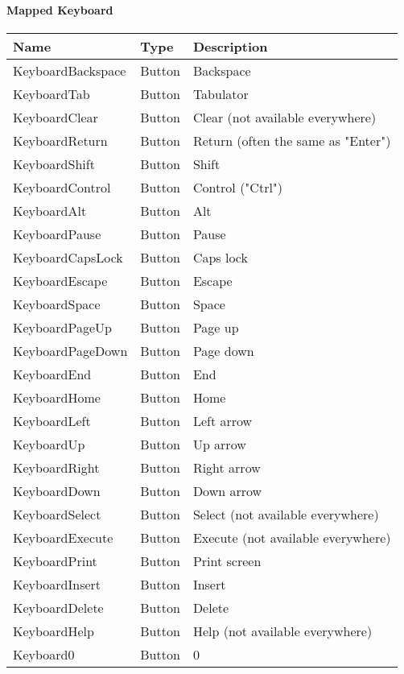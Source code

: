 \paragraph{Mapped Keyboard}
\begin{center}
	\centering
	\begin{longtable}{ | l | l | p{9cm} |}
	\hline
	Name						&	Type	&	Description \\ \hline
	KeyboardBackspace			&	Button	&	Backspace\\
	KeyboardTab					&	Button	&	Tabulator\\
	KeyboardClear				&	Button	&	Clear (not available everywhere)\\
	KeyboardReturn				&	Button	&	Return (often the same as "Enter")\\
	KeyboardShift				&	Button	&	Shift\\
	KeyboardControl				&	Button	&	Control ("Ctrl")\\
	KeyboardAlt					&	Button	&	Alt\\
	KeyboardPause				&	Button	&	Pause\\
	KeyboardCapsLock			&	Button	&	Caps lock\\
	KeyboardEscape				&	Button	&	Escape\\
	KeyboardSpace				&	Button	&	Space\\
	KeyboardPageUp				&	Button	&	Page up\\
	KeyboardPageDown			&	Button	&	Page down\\
	KeyboardEnd					&	Button	&	End\\
	KeyboardHome				&	Button	&	Home\\
	KeyboardLeft				&	Button	&	Left arrow\\
	KeyboardUp					&	Button	&	Up arrow\\
	KeyboardRight				&	Button	&	Right arrow\\
	KeyboardDown				&	Button	&	Down arrow\\
	KeyboardSelect				&	Button	&	Select (not available everywhere)\\
	KeyboardExecute				&	Button	&	Execute (not available everywhere)\\
	KeyboardPrint				&	Button	&	Print screen\\
	KeyboardInsert				&	Button	&	Insert\\
	KeyboardDelete				&	Button	&	Delete\\
	KeyboardHelp				&	Button	&	Help (not available everywhere)\\
	Keyboard0					&	Button	&	0\\

\end{longtable}
\end{center}
